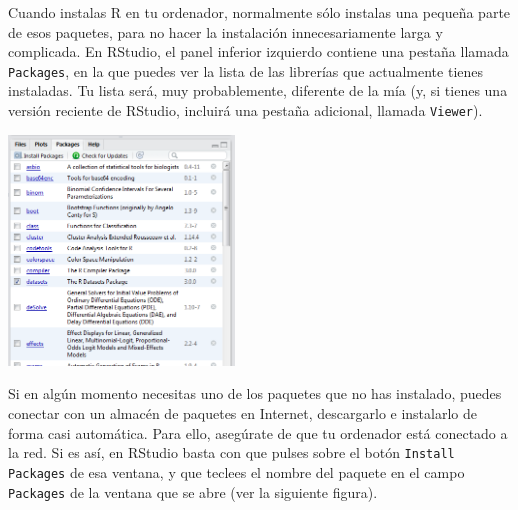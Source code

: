 \documentclass[10pt,a4paper]{article}\usepackage[]{graphicx}\usepackage[]{color}
\newcounter {cont01}
\begin{document}
      Cuando instalas  R en tu ordenador, normalmente sólo instalas una pequeña parte de esos paquetes, para no hacer la instalación innecesariamente larga y complicada. En RStudio, el panel inferior izquierdo contiene una pestaña llamada {\tt Packages}, en la que puedes ver la lista de las librerías que actualmente tienes instaladas. Tu lista será, muy probablemente, diferente de la mía (y, si tienes una versión reciente de RStudio, incluirá una pestaña adicional, llamada {\tt Viewer}).
      \begin{center}
      \includegraphics[width=6cm]{./fig/Tut05-10.png}
      \end{center}
      Si en algún momento necesitas uno de los paquetes  que no has instalado, puedes conectar con un almacén de paquetes en Internet, descargarlo e instalarlo de forma casi automática. Para ello, asegúrate de que tu ordenador está conectado a la red. Si es así, en RStudio basta con que pulses sobre el botón {\tt Install Packages} de esa ventana, y que teclees el nombre del paquete en el campo {\tt Packages} de la ventana que se abre (ver la siguiente figura).
      
\end{document}
